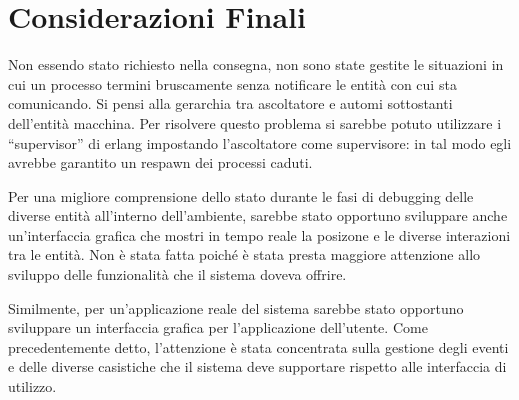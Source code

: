 
\chapter{Considerazioni Finali}

Non essendo stato richiesto nella consegna, non sono state gestite le situazioni in cui un processo termini bruscamente senza notificare le entità con cui sta comunicando. Si pensi alla gerarchia tra ascoltatore e automi sottostanti dell'entità macchina. Per risolvere questo problema si sarebbe potuto utilizzare i ``supervisor'' di erlang impostando l'ascoltatore come supervisore: in tal modo egli avrebbe garantito un respawn dei processi caduti.

Per una migliore comprensione dello stato durante le fasi di debugging delle diverse entità all'interno dell'ambiente, sarebbe stato opportuno sviluppare anche un'interfaccia grafica che mostri in tempo reale la posizone e le diverse interazioni tra le entità. Non è stata fatta poiché è stata presta maggiore attenzione allo sviluppo delle funzionalità che il sistema doveva offrire. 

Similmente, per un'applicazione reale del sistema sarebbe stato opportuno sviluppare un interfaccia grafica per l'applicazione dell'utente. Come precedentemente detto, l'attenzione è stata concentrata sulla gestione degli eventi e delle diverse casistiche che il sistema deve supportare rispetto alle interfaccia di utilizzo.
